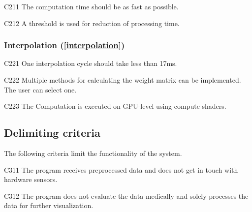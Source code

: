 	\begin{aims}
		
		\item[C211] The computation time should be as fast as possible.
		\item[C212] A threshold is used for reduction of processing time.
		
	\end{aims}
	
\subsubsection{Interpolation (\ref{interpolation})}

	\begin{aims}
	
		\item[C221] One interpolation cycle should take less than 17ms.
		\item[C222] Multiple methods for calculating the weight matrix can be implemented. The user can select one.
		\item[C223] The Computation is executed on GPU-level using compute shaders.
	
	\end{aims}
	
	
\subsection{Delimiting criteria} %
	
	The following criteria limit the functionality of the system.
	
	\begin{aims}
		
		\item[C311] The program receives preprocessed data and does not get in touch with hardware sensors.
		\item[C312] The program does not evaluate the data medically and solely processes the data for further 										visualization. 						
		
	\end{aims}
	



	
